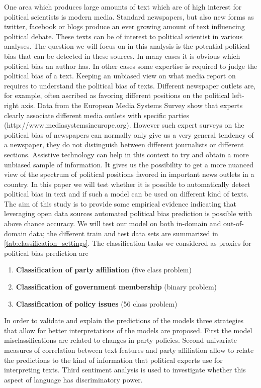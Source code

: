 \documentclass[11pt]{article}
\begin{document}
One area which produces large amounts of text which are of high interest for political scientists is modern media. Standard newspapers, but also new forms as twitter, facebook or blogs produce an ever growing amount of text influencing political debate. These texts can be of interest to political scientist in various analyses. The question we will focus on in this analysis is the potential political bias that can be detected in these sources. In many cases it is obvious which political bias an author has. In other cases some expertise is required to judge the political bias of a text. Keeping an unbiased view on what media report on requires to understand the political bias of texts. Different newspaper outlets are, for example, often ascribed as favoring different positions on the political left-right axis. Data from the European Media Systems Survey show that experts clearly associate different media outlets with specific parties (http://www.mediasystemsineurope.org). However such expert surveys on the political bias of newspapers can normally only give us a very general tendency of a newspaper, they do not distinguish between different journalists or different sections. Assistive technology can help in this context to try and obtain a more unbiased sample of information. It gives us the possibility to get a more nuanced view of the spectrum of political positions favored in important news outlets in a country. In this paper we will test whether it is possible to automatically detect political bias in text and if such a model can be used on different kind of texts. The aim of this study is to provide some empirical evidence indicating that leveraging open data sources automated political bias prediction is possible with above chance accuracy. We will test our model on both in-domain and out-of-domain data; the different train and test data sets are summarized in \autoref{tab:classification_settings}. The classification tasks we considered as proxies for political bias prediction are 

\begin{enumerate}
\item {\bf Classification of party affiliation} (five class problem)
\item {\bf Classification of government membership} (binary problem)
\item {\bf Classification of policy issues} (56 class problem)
\end{enumerate}

In order to validate and explain the predictions of the models three strategies that allow for better interpretations of the models are proposed. First the model misclassifications are related to changes in party policies. Second univariate measures of correlation between text features and party affiliation allow to relate the predictions to the kind of information that political experts use for interpreting texts. Third sentiment analysis is used to investigate whether this aspect of language has discriminatory power.
\end{document}
